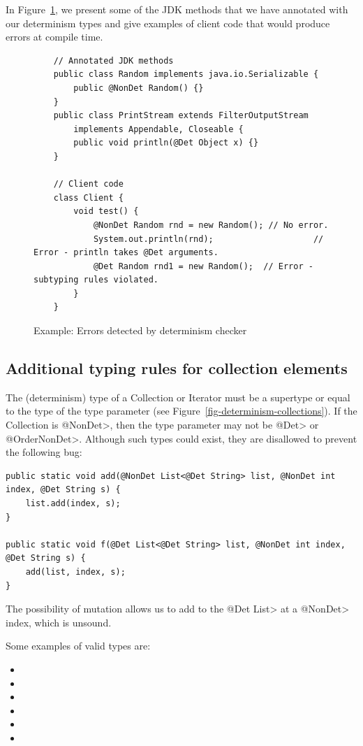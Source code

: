 In Figure~\ref{code-determinism}, we present some of the JDK methods that we have annotated with our determinism types and give examples of
client code that would produce errors at compile time.
\begin{figure}
	\begin{verbatim}
	// Annotated JDK methods
	public class Random implements java.io.Serializable {
	    public @NonDet Random() {}
	}
	public class PrintStream extends FilterOutputStream 
	    implements Appendable, Closeable {
	    public void println(@Det Object x) {}
	}
	
	// Client code
	class Client {
	    void test() {
	        @NonDet Random rnd = new Random(); // No error.
	        System.out.println(rnd);                    // Error - println takes @Det arguments.
	        @Det Random rnd1 = new Random();  // Error - subtyping rules violated.
	    }
	}
	\end{verbatim}
	\caption{Example: Errors detected by determinism checker}
	\label{code-determinism}
\end{figure}

\subsection{Additional typing rules for collection elements}
The (determinism) type of a Collection or Iterator must be a supertype or equal to
the type of the type parameter (see Figure~\ref{fig-determinism-collections}).
If the Collection is \<@NonDet>, then the type parameter may not be
\<@Det> or \<@OrderNonDet>. Although such types could exist, they are
disallowed to prevent the following bug:

\begin{verbatim}
public static void add(@NonDet List<@Det String> list, @NonDet int index, @Det String s) {
    list.add(index, s);
}

public static void f(@Det List<@Det String> list, @NonDet int index, @Det String s) {
    add(list, index, s);
}
\end{verbatim}

The possibility of mutation allows us to add to the \<@Det List> at a
\<@NonDet> index, which is unsound.

Some examples of valid types are:
\begin{itemize}
	\item {}
	\item {}
	\item {}
	\item {}
	\item {}
	\item {}
\end{itemize}


